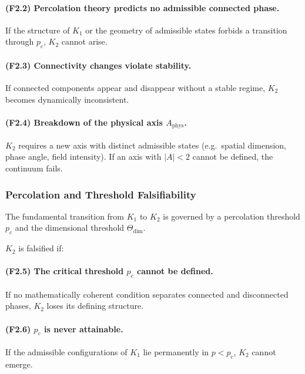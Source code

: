 \paragraph{(F2.2) Percolation theory predicts no admissible connected
phase.}
If the structure of $K_1$ or the geometry of admissible states forbids a
transition through $p_c$, $K_2$ cannot arise.

\paragraph{(F2.3) Connectivity changes violate stability.}
If connected components appear and disappear without a stable regime,
$K_2$ becomes dynamically inconsistent.

\paragraph{(F2.4) Breakdown of the physical axis $A_{\mathrm{phys}}$.}
$K_2$ requires a new axis with distinct admissible states (e.g.~spatial
dimension, phase angle, field intensity).
If an axis with $|A|<2$ cannot be defined, the continuum fails.



\subsubsection{Percolation and Threshold Falsifiability}

The fundamental transition from $K_1$ to $K_2$ is governed by a
percolation threshold $p_c$ and the dimensional threshold
$\Theta_{\mathrm{dim}}$.

$K_2$ is falsified if:

\paragraph{(F2.5) The critical threshold \texorpdfstring{$p_c$}{p_c} cannot be defined.}
If no mathematically coherent condition separates connected and
disconnected phases, $K_2$ loses its defining structure.

\paragraph{(F2.6) \texorpdfstring{$p_c$}{p_c} is never attainable.}
If the admissible configurations of $K_1$ lie permanently in
$p<p_c$, $K_2$ cannot emerge.

